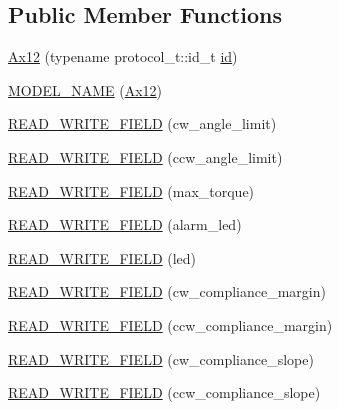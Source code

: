\subsection*{Public Member Functions}
\begin{DoxyCompactItemize}
\item 
\hyperlink{classdynamixel_1_1servos_1_1_ax12_a6db9721c05735e86c333caf3fe47034c}{Ax12} (typename protocol\+\_\+t\+::id\+\_\+t \hyperlink{classdynamixel_1_1servos_1_1_servo_a2d022081672e25a7bb57b76706e1cc57}{id})
\item 
\hyperlink{classdynamixel_1_1servos_1_1_ax12_ac334056a3c2d120949c80b3d3c4bbeaf}{M\+O\+D\+E\+L\+\_\+\+N\+A\+M\+E} (\hyperlink{classdynamixel_1_1servos_1_1_ax12}{Ax12})
\item 
\hyperlink{classdynamixel_1_1servos_1_1_ax12_a9bee4a74f0aa928c161363d51a956fbf}{R\+E\+A\+D\+\_\+\+W\+R\+I\+T\+E\+\_\+\+F\+I\+E\+L\+D} (cw\+\_\+angle\+\_\+limit)
\item 
\hyperlink{classdynamixel_1_1servos_1_1_ax12_a293e5759b7edd383bc5f8b9b657a6a5b}{R\+E\+A\+D\+\_\+\+W\+R\+I\+T\+E\+\_\+\+F\+I\+E\+L\+D} (ccw\+\_\+angle\+\_\+limit)
\item 
\hyperlink{classdynamixel_1_1servos_1_1_ax12_a327b37972212026e0b83a194031a18ce}{R\+E\+A\+D\+\_\+\+W\+R\+I\+T\+E\+\_\+\+F\+I\+E\+L\+D} (max\+\_\+torque)
\item 
\hyperlink{classdynamixel_1_1servos_1_1_ax12_a0f712acfa521757072a1d7ece40f4ab5}{R\+E\+A\+D\+\_\+\+W\+R\+I\+T\+E\+\_\+\+F\+I\+E\+L\+D} (alarm\+\_\+led)
\item 
\hyperlink{classdynamixel_1_1servos_1_1_ax12_a257ac353c0633829b28346f8ea0356fe}{R\+E\+A\+D\+\_\+\+W\+R\+I\+T\+E\+\_\+\+F\+I\+E\+L\+D} (led)
\item 
\hyperlink{classdynamixel_1_1servos_1_1_ax12_ac8f0a6a260b7640b7a0010560cf21530}{R\+E\+A\+D\+\_\+\+W\+R\+I\+T\+E\+\_\+\+F\+I\+E\+L\+D} (cw\+\_\+compliance\+\_\+margin)
\item 
\hyperlink{classdynamixel_1_1servos_1_1_ax12_a588350dba232b290ad054a2d3665e498}{R\+E\+A\+D\+\_\+\+W\+R\+I\+T\+E\+\_\+\+F\+I\+E\+L\+D} (ccw\+\_\+compliance\+\_\+margin)
\item 
\hyperlink{classdynamixel_1_1servos_1_1_ax12_abaaa2f066aa3c7608630361eaf92f3ab}{R\+E\+A\+D\+\_\+\+W\+R\+I\+T\+E\+\_\+\+F\+I\+E\+L\+D} (cw\+\_\+compliance\+\_\+slope)
\item 
\hyperlink{classdynamixel_1_1servos_1_1_ax12_aa2f70e43d4aefd6eed3513a084d9db2b}{R\+E\+A\+D\+\_\+\+W\+R\+I\+T\+E\+\_\+\+F\+I\+E\+L\+D} (ccw\+\_\+compliance\+\_\+slope)
\item 

\end{DoxyCompactItemize}
